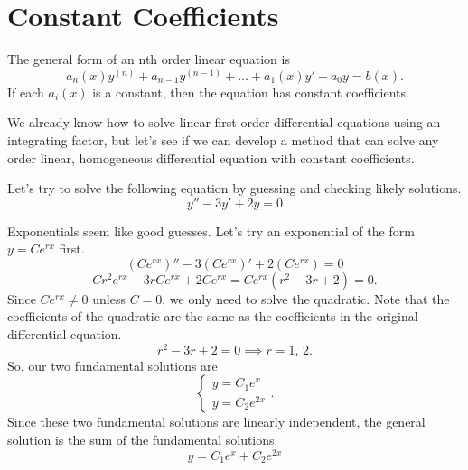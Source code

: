 \section{Constant Coefficients}
\begin{definition}
	The general form of an nth order linear equation is
	\begin{equation*}
		a_n(x)y^{(n)} + a_{n-1}y^{(n-1)} + \ldots + a_1(x)y' + a_0y = b(x).
	\end{equation*}
	If each $a_i(x)$ is a constant, then the equation has constant coefficients.
\end{definition}

\noindent
We already know how to solve linear first order differential equations using an integrating factor, but let's see if we can develop a method that can solve any order linear, homogeneous differential equation with constant coefficients.

\begin{example}
	Let's try to solve the following equation by guessing and checking likely solutions.
	\begin{equation*}
		y'' - 3y' + 2y = 0
	\end{equation*}
\end{example}
\noindent
Exponentials seem like good guesses. Let's try an exponential of the form $y = Ce^{rx}$ first.
\begin{equation*}
	\left(Ce^{rx}\right)'' - 3\left(Ce^{rx}\right)' + 2\left(Ce^{rx}\right) =  0
\end{equation*}
\begin{equation*}
	Cr^2e^{rx} - 3rCe^{rx} + 2Ce^{rx} = Ce^{rx}\left(r^2 - 3r + 2\right) = 0.
\end{equation*}
Since $Ce^{rx} \neq 0$ unless $C = 0$, we only need to solve the quadratic.
Note that the coefficients of the quadratic are the same as the coefficients in the original differential equation.
\begin{equation*}
	r^2 - 3r + 2 = 0 \implies r = 1 \text{, } 2.
\end{equation*}
So, our two fundamental solutions are
\begin{equation*}
	\begin{cases}
		y = C_1e^{x} \\
		y = C_2e^{2x}
	\end{cases}.
\end{equation*}
Since these two fundamental solutions are linearly independent, the general solution is the sum of the fundamental solutions.
\begin{equation*}
	y = C_1e^{x} + C_2e^{2x}
\end{equation*}


